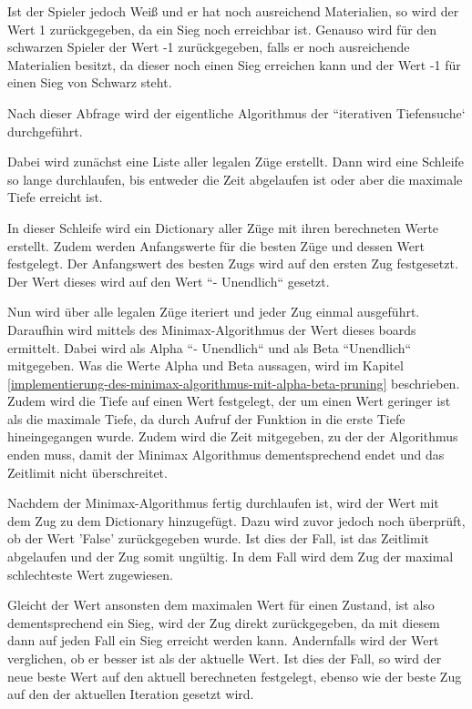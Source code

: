 Ist der Spieler jedoch Weiß und er hat noch ausreichend Materialien, so
wird der Wert 1 zurückgegeben, da ein Sieg noch erreichbar ist. Genauso
wird für den schwarzen Spieler der Wert -1 zurückgegeben, falls er noch
ausreichende Materialien besitzt, da dieser noch einen Sieg erreichen
kann und der Wert -1 für einen Sieg von Schwarz steht.

Nach dieser Abfrage wird der eigentliche Algorithmus der ``iterativen
Tiefensuche` durchgeführt.

    Dabei wird zunächst eine Liste aller legalen Züge erstellt. Dann wird
eine Schleife so lange durchlaufen, bis entweder die Zeit abgelaufen ist
oder aber die maximale Tiefe erreicht ist.

In dieser Schleife wird ein Dictionary aller Züge mit ihren berechneten
Werte erstellt. Zudem werden Anfangswerte für die besten Züge und dessen
Wert festgelegt. Der Anfangswert des besten Zugs wird auf den ersten Zug
festgesetzt. Der Wert dieses wird auf den Wert ``- Unendlich`` gesetzt.

Nun wird über alle legalen Züge iteriert und jeder Zug einmal ausgeführt. 
Daraufhin wird mittels des Minimax-Algorithmus der Wert dieses boards ermittelt.
Dabei wird als Alpha  ``- Unendlich`` und als Beta ``Unendlich`` mitgegeben. 
Was die Werte Alpha und Beta aussagen, wird im Kapitel \ref{implementierung-des-minimax-algorithmus-mit-alpha-beta-pruning}
beschrieben. Zudem wird die Tiefe auf einen Wert festgelegt, der um einen Wert geringer 
ist als die maximale Tiefe, da durch Aufruf der Funktion in die erste Tiefe 
hineingegangen wurde. Zudem wird die Zeit mitgegeben, zu der der Algorithmus 
enden muss, damit der Minimax Algorithmus dementsprechend endet und das
Zeitlimit nicht überschreitet.

Nachdem der Minimax-Algorithmus fertig durchlaufen ist, wird der Wert
mit dem Zug zu dem Dictionary hinzugefügt. Dazu wird zuvor jedoch noch überprüft, ob der Wert 'False' zurückgegeben wurde. Ist dies der Fall, ist das Zeitlimit abgelaufen und der Zug somit ungültig. In dem Fall wird dem Zug der maximal schlechteste Wert zugewiesen. 

Gleicht der Wert ansonsten dem maximalen Wert für einen Zustand, ist also dementsprechend ein Sieg,
wird der Zug direkt zurückgegeben, da mit diesem dann auf jeden Fall ein
Sieg erreicht werden kann. Andernfalls wird der Wert verglichen, ob er
besser ist als der aktuelle Wert. Ist dies der Fall, so wird der neue
beste Wert auf den aktuell berechneten festgelegt, ebenso wie der beste
Zug auf den der aktuellen Iteration gesetzt wird.

